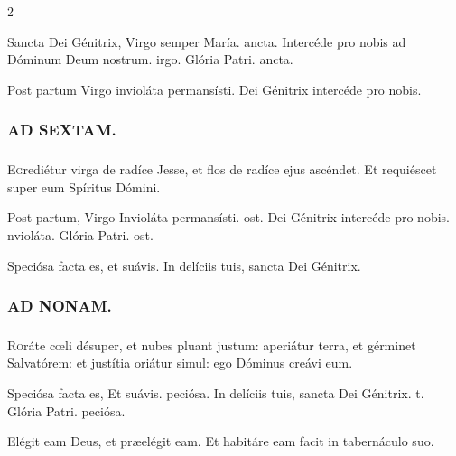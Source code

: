\documentclass[9pt,twoside]{extarticle}
\begin{document}
\begin{multicols}{2}
\begin{tightlist}{}
\item {} Sancta Dei Génitrix, \textred{*} Virgo semper María. ancta.  Intercéde pro nobis ad Dóminum Deum nostrum. irgo. Glória Patri. ancta.
\item {} Post partum Virgo invioláta permansísti.  Dei Génitrix intercéde pro nobis.
\end{tightlist}

\subsubsection*{\center \textsc{AD SEXTAM.}}
\subsubsection*{}
\lettrine{E}grediétur virga de radíce Jesse, et flos de radíce ejus ascéndet. Et requiéscet super eum Spíritus Dómini.

\begin{tightlist}{}
\item {} Post partum, Virgo \textred{*} Invioláta permansísti. ost.  Dei Génitrix intercéde pro nobis. nvioláta. Glória Patri. ost.
\item {} Speciósa facta es, et suávis.  In delíciis tuis, sancta Dei Génitrix.
\end{tightlist}

\subsubsection*{\center \textsc{AD NONAM.}}
\subsubsection*{}
\lettrine{R}oráte cœli désuper, et nubes pluant justum: aperiátur terra, et gérminet Salvatórem: et justítia oriátur simul: ego Dóminus creávi eum.

\begin{tightlist}{}
\item {} Speciósa facta es, \textred{*} Et suávis. peciósa.  In delíciis tuis, sancta Dei Génitrix. t. Glória Patri. peciósa.
\item {} Elégit eam Deus, et præelégit eam.  Et habitáre eam facit in tabernáculo suo.
\end{tightlist}


\end{multicols}
\end{document}
